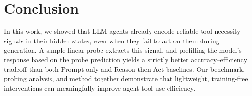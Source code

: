 \section{Conclusion}
\label{sec:conclusion}

In this work, we showed that LLM agents already encode reliable tool-necessity signals in their hidden states, even when they fail to act on them during generation. A simple linear probe extracts this signal, and prefilling the model's response based on the probe prediction yields a strictly better accuracy--efficiency tradeoff than both Prompt-only and Reason-then-Act baselines. Our benchmark, probing analysis, and method together demonstrate that lightweight, training-free interventions can meaningfully improve agent tool-use efficiency.
